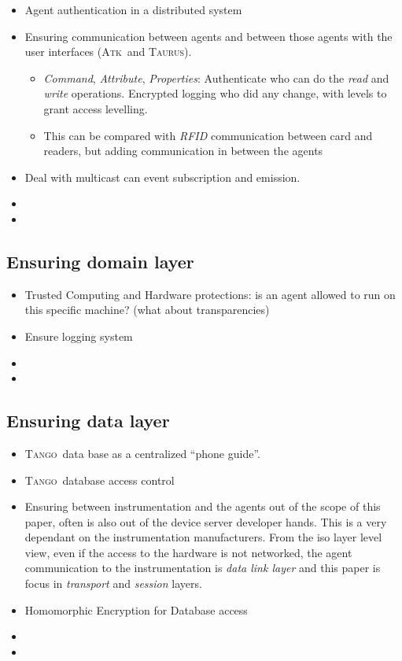 \documentclass[10pt,a4paper,twoside]{llncs}
\newcommand{\tango}{\textsc{Tango}}
\newcommand{\taurus}{\textsc{Taurus}}
\newcommand{\atk}{\textsc{Atk}}
\begin{document}
\begin{itemize}
 \item Agent authentication in a distributed system
 \item Ensuring communication between agents and between those agents with the user interfaces (\atk\, and \taurus).
 \begin{itemize}
  \item \emph{Command}, \emph{Attribute}, \emph{Properties}: Authenticate who can do the \emph{read} and \emph{write} operations. Encrypted logging who did any change, with levels to grant access levelling.
  \item This can be compared with \emph{RFID} communication between card and readers, but adding communication in between the agents
 \end{itemize}
 \item Deal with multicast can event subscription and emission.
 \item 
 \item 
\end{itemize}

%
\subsection{Ensuring domain layer \label{sec:domainLayer}}

\begin{itemize}
 \item Trusted Computing and Hardware protections: is an agent allowed to run on this specific machine? (what about transparencies)
 \item Ensure logging system
 \item 
 \item
\end{itemize}

%
\subsection{Ensuring data layer \label{sec:dataLayer}}

\begin{itemize}
 \item \tango\, data base as a centralized ``phone guide''.
 \item \tango\, database access control
 \item Ensuring between instrumentation and the agents out of the scope of this paper, often is also out of the device server developer hands. This is a very dependant on the instrumentation manufacturers. From the iso layer level view, even if the access to the hardware is not networked, the agent communication to the instrumentation is \emph{data link layer} and this paper is focus in \emph{transport} and \emph{session} layers.
 \item Homomorphic Encryption for Database access
 \item  
 \item 
\end{itemize}
\end{document}
